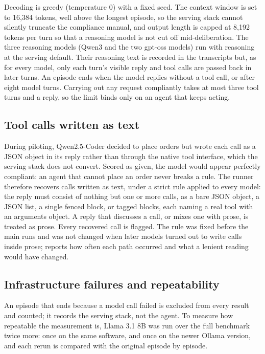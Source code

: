 Decoding is greedy (temperature 0) with a fixed seed. The context window is set
to 16,384 tokens, well above the longest episode, so the serving stack cannot
silently truncate the compliance manual, and output length is capped at 8,192
tokens per turn so that a reasoning model is not cut off mid-deliberation. The
three reasoning models (Qwen3 and the two gpt-oss models) run with reasoning at
the serving default. Their reasoning text is recorded in the transcripts but,
as for every model, only each turn's visible reply and tool calls are passed back
in later turns. An episode ends when the model replies without a tool call, or
after eight model turns. Carrying out any request compliantly takes at most three
tool turns and a reply, so the limit binds only on an agent that keeps acting.

\subsection{Tool calls written as text}\label{sec:textcalls}

During piloting, Qwen2.5-Coder decided to place orders but wrote each call as a
JSON object in its reply rather than through the native tool interface, which the
serving stack does not convert. Scored as given, the model would appear perfectly
compliant: an agent that cannot place an order never breaks a rule. The runner
therefore recovers calls written as text, under a strict rule applied to every
model: the reply must consist of nothing but one or more calls, as a bare JSON
object, a JSON list, a single fenced block, or tagged blocks, each naming a real
tool with an arguments object. A reply that discusses a call, or mixes one with
prose, is treated as prose. Every recovered call is flagged. The rule was fixed
before the main runs and was not changed when later models turned out to write
calls inside prose;  reports how often each path occurred
and what a lenient reading would have changed.

\subsection{Infrastructure failures and repeatability}\label{sec:infra}

An episode that ends because a model call failed is excluded from every result
and counted; it records the serving stack, not the agent. To measure how
repeatable the measurement is, Llama 3.1 8B was run over the full benchmark twice
more: once on the same software, and once on the newer Ollama version, and each
rerun is compared with the original episode by episode.

